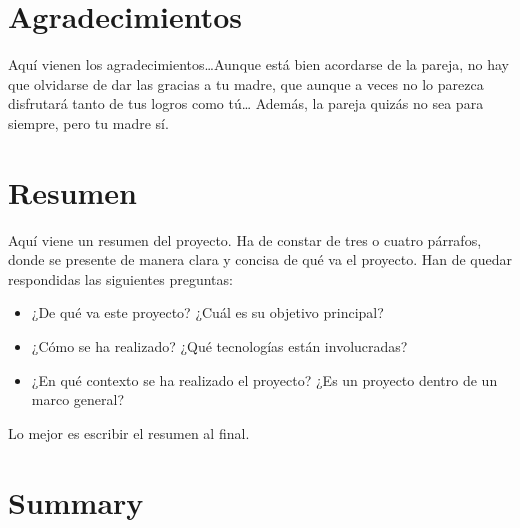 \documentclass[a4paper, 12pt]{book}
\begin{document}

\chapter*{Agradecimientos}

Aquí vienen los agradecimientos\ldots Aunque está bien acordarse de la pareja, no hay que olvidarse de dar las gracias a tu madre, que aunque a veces no lo parezca disfrutará tanto de tus logros como tú\ldots
Además, la pareja quizás no sea para siempre, pero tu madre sí.


\chapter*{Resumen}

Aquí viene un resumen del proyecto. Ha de constar de tres o cuatro párrafos, donde se presente de manera clara y concisa de qué va el proyecto.
Han de quedar respondidas las siguientes preguntas:

\begin{itemize}
  \item ¿De qué va este proyecto? ¿Cuál es su objetivo principal?
  \item ¿Cómo se ha realizado? ¿Qué tecnologías están involucradas?
  \item ¿En qué contexto se ha realizado el proyecto? ¿Es un proyecto
dentro de un marco general?
\end{itemize}

Lo mejor es escribir el resumen al final.


\chapter*{Summary}
\end{document}
